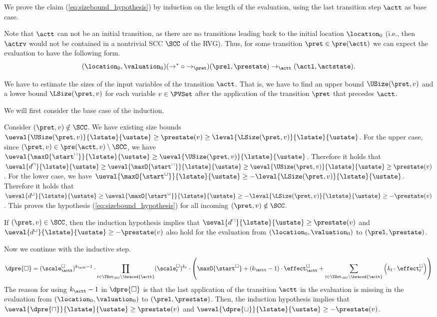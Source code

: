 We prove the claim (\ref{eq:sizebound_hypothesis}) by induction on the length of the evaluation, using the last transition step $\actt$ as base case.

Note that $\actt$ can not be an initial transition, as there are no transitions leading back to the initial location $\location_0$
(i.e., then $\actrv$ would not be contained in a nontrivial SCC $\SCC$ of the RVG).
Thus, for some transition $\pret \in \pre(\actt)$ we can expect the evaluation to have the following form.
\[ (\location_0, \valuation_0) (\rightarrow^* \circ \rightarrow_\pret) (\prel, \prestate) \rightarrow_\actt (\actl, \actstate). \]

We have to estimate the sizes of the input variables of the transition $\actt$.
That is, we have to find an upper bound $\USize(\pret, v)$ and a lower bound $\LSize(\pret, v)$ for each variable $v \in \PVSet$ after the application of the transition $\pret$ that precedes $\actt$.

We will first consider the base case of the induction.

Consider $(\pret, v) \notin \SCC$.
We have existing size bounds $\ueval{\USize(\pret, v)}{\lstate}{\ustate} \geq \prestate(v) \geq \leval{\LSize(\pret, v)}{\lstate}{\ustate}$.
For the upper case, since $(\pret, v) \in \pre(\actt, v) \setminus \SCC$, we have $\ueval{\maxO{\start^\sqcap}}{\lstate}{\ustate} \geq \ueval{\USize(\pret, v)}{\lstate}{\ustate}$.
Therefore it holds that $\ueval{d^\sqcap}{\lstate}{\ustate} \geq \ueval{\maxO{\start^\sqcap}}{\lstate}{\ustate} \geq \ueval{\USize(\pret, v)}{\lstate}{\ustate} \geq \prestate(v)$.
For the lower case, we have $\ueval{\maxO{\start^\sqcup}}{\lstate}{\ustate} \geq -\leval{\LSize(\pret, v)}{\lstate}{\ustate}$.
Therefore it holds that $\ueval{d^\sqcup}{\lstate}{\ustate} \geq \ueval{\maxO{\start^\sqcup}}{\lstate}{\ustate} \geq -\leval{\LSize(\pret, v)}{\lstate}{\ustate} \geq -\prestate(v)$.
This proves the hypothesis (\ref{eq:sizebound_hypothesis}) for all incoming $(\pret, v) \notin \SCC$.

If $(\pret, v) \in \SCC$, then the induction hypothesis implies that $\ueval{d^\sqcap}{\lstate}{\ustate} \geq \prestate(v)$ and $\ueval{d^\sqcup}{\lstate}{\ustate} \geq -\prestate(v)$ also hold for the evaluation from $(\location_0, \valuation_0)$ to $(\prel, \prestate)$.

Now we continue with the inductive step.
\begin{equation} \label{eq:induction_consequence}
  \dpre{\square} = (\scale^\square_\actt)^{k_\actt - 1} \cdot \prod_{t \in \TSet_\SCC \setminus \braced{\actt}} (\scale^\square_t)^{k_t} \cdot \left( \maxO{\start^\square} + \left( k_\actt - 1 \right) \cdot \effect^\square_\actt + \sum_{t \in \TSet_\SCC \setminus \braced{\actt}} \left( k_t \cdot \effect^\square_t \right) \right)
\end{equation}
The reason for using $k_\actt - 1$ in $\dpre{\square}$ is that the last application of the transition $\actt$ in the evaluation is missing in the evaluation from $(\location_0, \valuation_0)$ to $(\prel, \prestate)$.
Then, the induction hypothesis implies that $\ueval{\dpre{\sqcap}}{\lstate}{\ustate} \geq \prestate(v)$ and $\ueval{\dpre{\sqcup}}{\lstate}{\ustate} \geq -\prestate(v)$.

